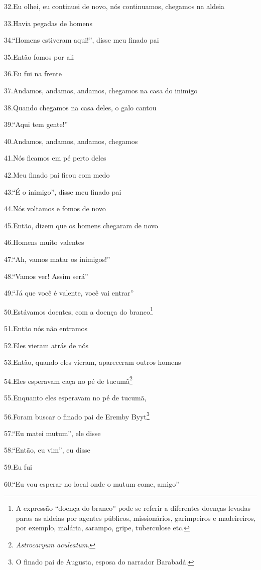 32.Eu olhei, eu continuei de novo, nós continuamos, chegamos na aldeia

33.Havia pegadas de homens

34.``Homens estiveram aqui!'', disse meu finado pai

35.Então fomos por ali

36.Eu fui na frente

37.Andamos, andamos, andamos, chegamos na casa do inimigo

38.Quando chegamos na casa deles, o galo cantou

39.``Aqui tem gente!''

40.Andamos, andamos, andamos, chegamos

41.Nós ficamos em pé perto deles

42.Meu finado pai ficou com medo

43.``É o inimigo'', disse meu finado pai

44.Nós voltamos e fomos de novo

45.Então, dizem que os homens chegaram de novo

46.Homens muito valentes

47.``Ah, vamos matar os inimigos!''

48.``Vamos ver! Assim será''

49.``Já que você é valente, você vai entrar''

50.Estávamos doentes, com a doença do branco\footnote{A expressão
  ``doença do branco'' pode se referir a diferentes doenças levadas
  paras as aldeias por agentes públicos, missionários, garimpeiros e
  madeireiros, por exemplo, malária, sarampo, gripe, tuberculose etc.}

51.Então nós não entramos

52.Eles vieram atrás de nós

53.Então, quando eles vieram, apareceram outros homens

54.Eles esperavam caça no pé de tucumã\footnote{\emph{Astrocaryum
  aculeatum}.}

55.Enquanto eles esperavam no pé de tucumã,

56.Foram buscar o finado pai de Eremby Byyt\footnote{O finado pai de
  Augusta, esposa do narrador Barabadá.}

57.``Eu matei mutum'', ele disse

58.``Então, eu vim'', eu disse

59.Eu fui

60.``Eu vou esperar no local onde o mutum come, amigo''

